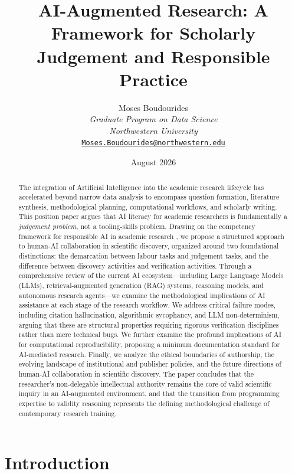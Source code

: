 \documentclass[12pt, a4paper]{article}
\title{\textbf{AI-Augmented Research: A Framework for Scholarly Judgement and Responsible Practice}}
\author{Moses Boudourides \\ \textit{Graduate Program on Data Science} \\ \textit{Northwestern University} \\ \href{mailto:Moses.Boudourides@northwestern.edu}{\texttt{Moses.Boudourides@northwestern.edu}}}
\date{August 2026}
\begin{document}
\maketitle

\begin{abstract}
The integration of Artificial Intelligence into the academic research lifecycle has accelerated beyond narrow data analysis to encompass question formation, literature synthesis, methodological planning, computational workflows, and scholarly writing. This position paper argues that AI literacy for academic researchers is fundamentally a \textit{judgement problem}, not a tooling-skills problem. Drawing on the competency framework for responsible AI in academic research \citep{zyphur2026responsible}, we propose a structured approach to human-AI collaboration in scientific discovery, organized around two foundational distinctions: the demarcation between labour tasks and judgement tasks, and the difference between discovery activities and verification activities. Through a comprehensive review of the current AI ecosystem---including Large Language Models (LLMs), retrieval-augmented generation (RAG) systems, reasoning models, and autonomous research agents---we examine the methodological implications of AI assistance at each stage of the research workflow. We address critical failure modes, including citation hallucination, algorithmic sycophancy, and LLM non-determinism, arguing that these are structural properties requiring rigorous verification disciplines rather than mere technical bugs. We further examine the profound implications of AI for computational reproducibility, proposing a minimum documentation standard for AI-mediated research. Finally, we analyze the ethical boundaries of authorship, the evolving landscape of institutional and publisher policies, and the future directions of human-AI collaboration in scientific discovery. The paper concludes that the researcher's non-delegable intellectual authority remains the core of valid scientific inquiry in an AI-augmented environment, and that the transition from programming expertise to validity reasoning represents the defining methodological challenge of contemporary research training.
\end{abstract}

\newpage
\tableofcontents
\newpage

\section{Introduction}
\end{document}
